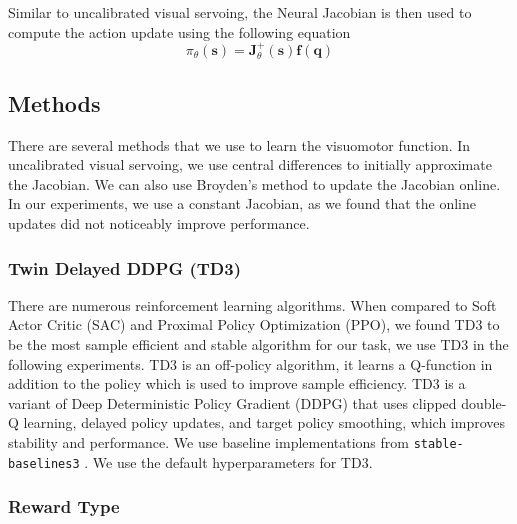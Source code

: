\documentclass[letterpaper, 10 pt, conference]{ieeeconf}  %
\begin{document}
Similar to uncalibrated visual servoing, the Neural Jacobian is then used to
compute the action update using the following equation
\begin{equation}
    \pi_\theta(\mathbf{s}) = \mathbf{J}_\theta^{+}(\mathbf{s}) \mathbf{f}(\mathbf{q})
\end{equation}

\subsection{Methods}

There are several methods that we use to learn the visuomotor function. In uncalibrated
visual servoing, we use central differences to initially approximate the Jacobian. We
can also use Broyden's method to update the Jacobian online. In our experiments,
we use a constant Jacobian, as we found that the online updates did not noticeably
improve performance.

\subsubsection{Twin Delayed DDPG (TD3)}

There are numerous reinforcement learning algorithms. When compared
to Soft Actor Critic (SAC) and Proximal Policy Optimization (PPO), we found TD3 to be the most sample efficient and stable
algorithm for our task, we use TD3 in the following experiments. TD3 is an
off-policy algorithm, it learns a Q-function in addition to the policy which is
used to improve sample efficiency. TD3 is a variant of Deep Deterministic Policy Gradient (DDPG) that uses clipped
double-Q learning, delayed policy updates, and target policy smoothing, which
improves stability and performance. \cite{Fujimoto2018} We use baseline
implementations from \texttt{stable-baselines3} \cite{Raffin2021}. We use
the default hyperparameters for TD3.

\subsubsection{Reward Type}
\end{document}
